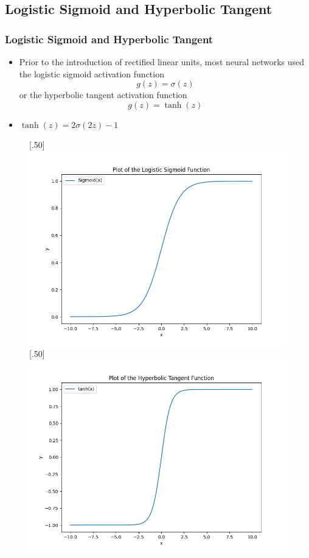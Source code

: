 \documentclass{beamer}
\begin{document}
\subsection{Logistic Sigmoid and Hyperbolic Tangent}
\begin{frame}
\frametitle{Logistic Sigmoid and Hyperbolic Tangent}
	\begin{itemize}
		\item Prior to the introduction of rectiﬁed linear units, most neural networks used the logistic sigmoid activation function
			$$g(z)= \sigma(z)$$
or the hyperbolic tangent activation function
			$$ g(z)= \tanh(z)$$
		\item $\tanh(z) = 2\sigma(2z)-1$
	\end{itemize}
\end{frame}
\begin{frame}
\begin{figure}[ht]
  [.50\linewidth]{%
    \includegraphics[width=\linewidth]{sigmoid.png}%
  }%
  \hfill
  [.50\linewidth]{%
	  \includegraphics[width=\linewidth]{tanh.png}%
  }
\end{figure}

\end{frame}
\end{document}
